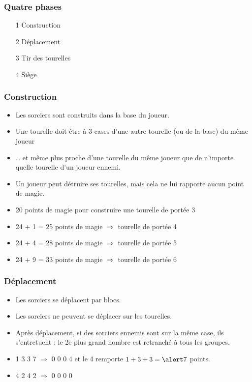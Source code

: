\documentclass{beamer}
\begin{document}
\begin{frame}
	\frametitle{Quatre phases}
	\begin{itemize}
	\item[1] Construction
	\item[2] Déplacement
	\item[3] Tir des tourelles
	\item[4] Siège
	\end{itemize}
\end{frame}

\begin{frame}
	\frametitle{Construction}
	\begin{itemize}
	\item Les sorciers sont construits dans la base du joueur.
	\item Une tourelle doit être à 3 cases d'une autre tourelle (ou de la base) du même joueur
	\item … et même plus proche d'une tourelle du même joueur que de n'importe quelle tourelle d'un joueur ennemi.
	\item Un joueur peut détruire ses tourelles, mais cela ne lui rapporte aucun point de magie.
	\end{itemize}
	\pause
	\begin{itemize}
	\item \alert{20} points de magie pour construire une tourelle de portée \alert3
	\item 24 + 1 = \alert{25} points de magie $\Rightarrow$ tourelle de portée \alert4
	\item 24 + 4 = \alert{28} points de magie $\Rightarrow$ tourelle de portée \alert5
	\item 24 + 9 = \alert{33} points de magie $\Rightarrow$ tourelle de portée \alert6
	\end{itemize}
\end{frame}

\begin{frame}
	\frametitle{Déplacement}
	\begin{itemize}
	\item Les sorciers se déplacent par blocs.
	\item Les sorciers ne peuvent se déplacer sur les tourelles.
	\item Après déplacement, si des sorciers ennemis sont sur la même case, ils s'entretuent : le 2e plus grand nombre est retranché à tous les groupes.
	\end{itemize}
	\begin{example}[Exemple]
	\begin{itemize}
	\item 1 3 3 7 $\Rightarrow$ 0 0 0 4 et le 4\ieme{} remporte $1 + 3 + 3 = \alert7$ points.
	\item 4 2 4 2 $\Rightarrow$ 0 0 0 0
	\end{itemize}
	\end{example}
\end{frame}
\end{document}
